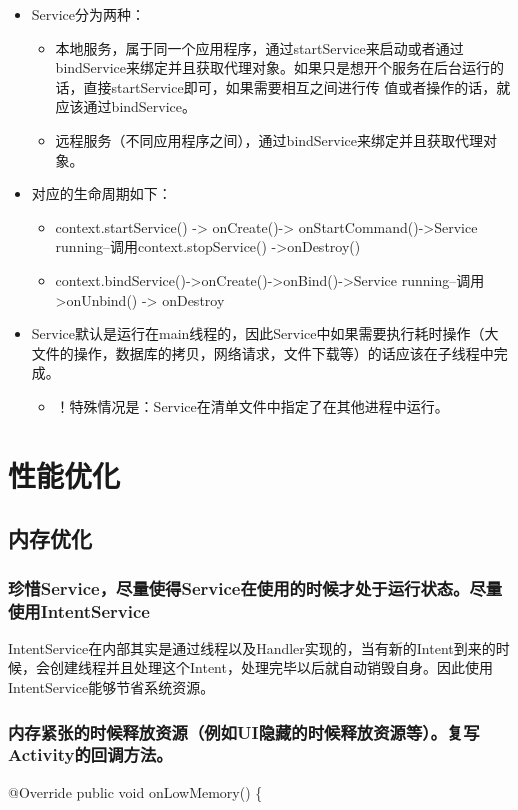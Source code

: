 \documentclass[9pt, b5paaper]{book}
\begin{document}
\begin{itemize}
\item Service分为两种：
\begin{itemize}
\item 本地服务，属于同一个应用程序，通过startService来启动或者通过bindService来绑定并且获取代理对象。如果只是想开个服务在后台运行的话，直接startService即可，如果需要相互之间进行传 值或者操作的话，就应该通过bindService。
\item 远程服务（不同应用程序之间），通过bindService来绑定并且获取代理对象。
\end{itemize}
\item 对应的生命周期如下： 
\begin{itemize}
\item context.startService() -> onCreate()-> onStartCommand()->Service running--调用context.stopService() ->onDestroy()
\item context.bindService()->onCreate()->onBind()->Service running--调用>onUnbind() -> onDestroy
\end{itemize}
\item Service默认是运行在main线程的，因此Service中如果需要执行耗时操作（大文件的操作，数据库的拷贝，网络请求，文件下载等）的话应该在子线程中完成。
\begin{itemize}
\item ！特殊情况是：Service在清单文件中指定了在其他进程中运行。
\end{itemize}
\end{itemize}


\chapter{性能优化}
\label{sec-7}
\section{内存优化}
\label{sec-7-1}
\subsection{珍惜Service，尽量使得Service在使用的时候才处于运行状态。尽量使用IntentService}
\label{sec-7-1-1}
IntentService在内部其实是通过线程以及Handler实现的，当有新的Intent到来的时候，会创建线程并且处理这个Intent，处理完毕以后就自动销毁自身。因此使用IntentService能够节省系统资源。
\subsection{内存紧张的时候释放资源（例如UI隐藏的时候释放资源等）。复写Activity的回调方法。}
\label{sec-7-1-2}
@Override 
 public void onLowMemory() \{ 
\end{document}
